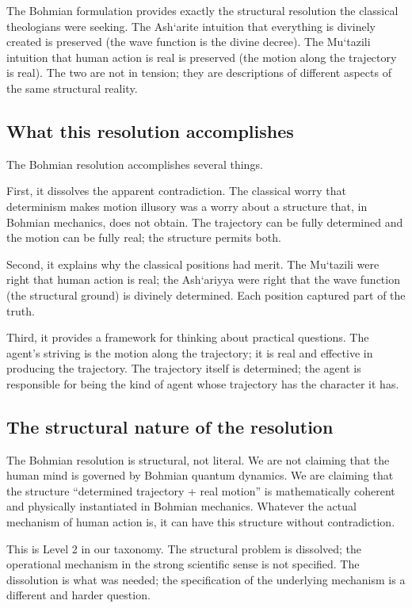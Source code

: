 The Bohmian formulation provides exactly the structural resolution
the classical theologians were seeking. The Ash`arite intuition
that everything is divinely created is preserved (the wave
function is the divine decree). The Mu`tazili intuition that
human action is real is preserved (the motion along the trajectory
is real). The two are not in tension; they are descriptions of
different aspects of the same structural reality.

\subsection{What this resolution accomplishes}

The Bohmian resolution accomplishes several things.

First, it dissolves the apparent contradiction. The classical
worry that determinism makes motion illusory was a worry about a
structure that, in Bohmian mechanics, does not obtain. The
trajectory can be fully determined and the motion can be fully
real; the structure permits both.

Second, it explains why the classical positions had merit. The
Mu`tazili were right that human action is real; the Ash`ariyya
were right that the wave function (the structural ground) is
divinely determined. Each position captured part of the truth.

Third, it provides a framework for thinking about practical
questions. The agent's striving is the motion along the
trajectory; it is real and effective in producing the trajectory.
The trajectory itself is determined; the agent is responsible
for being the kind of agent whose trajectory has the character it
has.

\subsection{The structural nature of the resolution}

The Bohmian resolution is structural, not literal. We are not
claiming that the human mind is governed by Bohmian quantum
dynamics. We are claiming that the structure ``determined
trajectory + real motion'' is mathematically coherent and
physically instantiated in Bohmian mechanics. Whatever the actual
mechanism of human action is, it can have this structure without
contradiction.

This is Level 2 in our taxonomy. The structural problem is
dissolved; the operational mechanism in the strong scientific
sense is not specified. The dissolution is what was needed; the
specification of the underlying mechanism is a different and
harder question.

